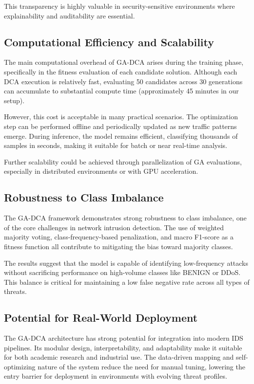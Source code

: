 \documentclass[conference]{IEEEtran}
\begin{document}
This transparency is highly valuable in security-sensitive
environments where explainability and auditability are essential.

\subsection{Computational Efficiency and Scalability}

The main computational overhead of GA-DCA arises during the training
phase, specifically in the fitness evaluation of each candidate
solution. Although each DCA execution is relatively fast, evaluating
50 candidates across 30 generations can accumulate to substantial
compute time (approximately 45 minutes in our setup).

However, this cost is acceptable in many practical scenarios. The
optimization step can be performed offline and periodically updated
as new traffic patterns emerge. During inference, the model remains
efficient, classifying thousands of samples in seconds, making it
suitable for batch or near real-time analysis.

Further scalability could be achieved through parallelization of GA
evaluations, especially in distributed environments or with GPU acceleration.

\subsection{Robustness to Class Imbalance}

The GA-DCA framework demonstrates strong robustness to class
imbalance, one of the core challenges in network intrusion detection.
The use of weighted majority voting, class-frequency-based
penalization, and macro F1-score as a fitness function all contribute
to mitigating the bias toward majority classes.

The results suggest that the model is capable of identifying
low-frequency attacks without sacrificing performance on high-volume
classes like BENIGN or DDoS. This balance is critical for maintaining
a low false negative rate across all types of threats.

\subsection{Potential for Real-World Deployment}

The GA-DCA architecture has strong potential for integration into
modern IDS pipelines. Its modular design, interpretability, and
adaptability make it suitable for both academic research and
industrial use. The data-driven mapping and self-optimizing nature of
the system reduce the need for manual tuning, lowering the entry
barrier for deployment in environments with evolving threat profiles.
\end{document}
